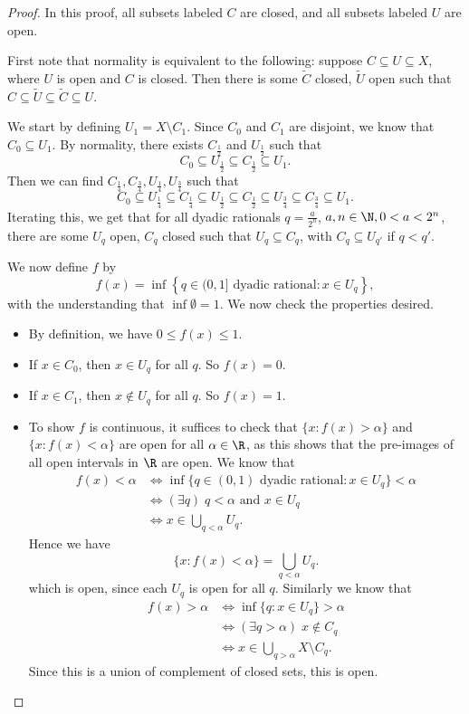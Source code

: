 \documentclass[a4paper]{article}
\begin{document}
\begin{proof}
  In this proof, all subsets labeled $C$ are closed, and all subsets labeled $U$ are open.

  First note that normality is equivalent to the following: suppose $C \subseteq U \subseteq X$, where $U$ is open and $C$ is closed. Then there is some $\tilde{C}$ closed, $\tilde{U}$ open such that $C\subseteq \tilde{U} \subseteq \tilde{C} \subseteq U$.

  We start by defining $U_1 = X \setminus C_1$. Since $C_0$ and $C_1$ are disjoint, we know that $C_0 \subseteq U_1$. By normality, there exists $C_{\frac{1}{2}}$ and $U_{\frac{1}{2}}$ such that
  \[
    C_0 \subseteq U_{\frac{1}{2}} \subseteq C_{\frac{1}{2}} \subseteq U_1.
  \]
  Then we can find $C_{\frac{1}{4}}, C_{\frac{3}{4}}, U_{\frac{1}{4}}, U_{\frac{3}{4}}$ such that
  \[
    C_0 \subseteq U_{\frac{1}{4}}\subseteq C_{\frac{1}{4}} \subseteq U_{\frac{1}{2}} \subseteq C_{\frac{1}{2}} \subseteq U_{\frac{3}{4}} \subseteq C_{\frac{3}{4}} \subseteq U_1.
  \]
  Iterating this, we get that for all dyadic rationals $q = \frac{a}{2^n}$, $a, n\in \N, 0 < a < 2^n$, there are some $U_q$ open, $C_q$ closed such that $U_q \subseteq C_q$, with $C_q \subseteq U_{q'}$ if $q < q'$.

  We now define $f$ by
  \[
  f(x) = \inf\left\{q \in (0, 1] \text{ dyadic rational}: x \in U_q\right\},
\]
with the understanding that $\inf \emptyset = 1$. We now check the properties desired.
\begin{itemize}
  \item By definition, we have $0 \leq f(x) \leq 1$.
  \item If $x \in C_0$, then $x \in U_q$ for all $q$. So $f(x) = 0$.
  \item If $x \in C_1$, then $x \not\in U_q$ for all $q$. So $f(x) = 1$.
  \item To show $f$ is continuous, it suffices to check that $\{x: f(x) > \alpha\}$ and $\{x: f(x) < \alpha\}$ are open for all $\alpha \in \R$, as this shows that the pre-images of all open intervals in $\R$ are open. We know that
    \begin{align*}
      f(x) < \alpha &\Leftrightarrow \inf\{q \in (0, 1)\text{ dyadic rational}: x \in U_q\} < \alpha \\
      &\Leftrightarrow (\exists q)\; q < \alpha \text{ and }x \in U_q\\
      &\Leftrightarrow x \in \bigcup_{q < \alpha} U_q.
    \end{align*}
    Hence we have
    \[
      \{x: f(x) < \alpha\} = \bigcup_{q < \alpha} U_q.
    \]
    which is open, since each $U_q$ is open for all $q$. Similarly we know that
    \begin{align*}
      f(x) > \alpha &\Leftrightarrow \inf\{q: x \in U_q\} > \alpha\\
      &\Leftrightarrow (\exists q > \alpha)\; x \not\in C_q\\
      &\Leftrightarrow x \in \bigcup_{q > \alpha} X \setminus C_q.
    \end{align*}
    Since this is a union of complement of closed sets, this is open.\qedhere
\end{itemize}
\end{proof}
\end{document}
